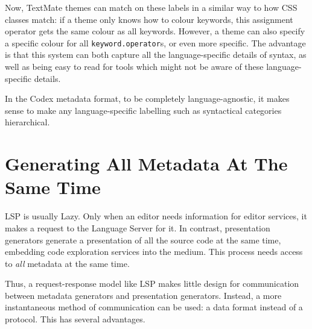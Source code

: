 Now, TextMate themes can match on these labels in a similar way to how CSS classes match:
if a theme only knows how to colour keywords, this assignment operator gets the same colour as all keywords.
However, a theme can also specify a specific colour for all \texttt{keyword.operator}s, or even more specific.
The advantage is that this system can both capture all the language-specific details of syntax,
as well as being easy to read for tools which might not be aware of these language-specific details.

In the Codex metadata format, to be completely language-agnostic,
it makes sense to make any language-specific labelling such as syntactical categories hierarchical.

\section{Generating All Metadata At The Same Time}\label{sec:generating-all-metadata-at-the-same-time}

\ac{LSP} is usually Lazy.
Only when an editor needs information for editor services, it makes a request to the Language Server for it.
In contrast, presentation generators generate a presentation of all the source code at the same time,
embedding code exploration services into the medium.
This process needs access to \emph{all} metadata at the same time.

Thus, a request-response model like \ac{LSP} makes little design for communication between metadata generators and presentation generators.
Instead, a more instantaneous method of communication can be used: a data format instead of a protocol.
This has several advantages.



